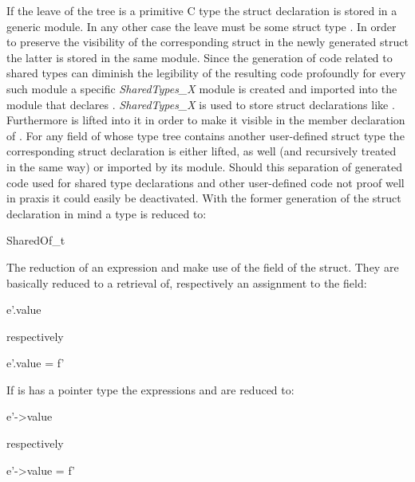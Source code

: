 \vspace{0.5cm}
If the leave of the tree is a primitive C type the struct declaration is stored in a generic module. In any other case the leave must be some struct type . In order to preserve the visibility of the corresponding struct in the newly generated struct  the latter is stored in the same module. Since the generation of code related to shared types can diminish the legibility of the resulting code profoundly for every such module a specific \textit{SharedTypes\_X} module is created and imported into the module that declares . \textit{SharedTypes\_X} is used to store struct declarations like . Furthermore  is lifted into it in order to make it visible in the member declaration  of . For any field of  whose type tree contains another user-defined struct type the corresponding struct declaration is either lifted, as well (and recursively treated in the same way) or imported by its module. Should this separation of generated code used for shared type declarations and other user-defined code not proof well in praxis it could easily be deactivated.
With the former generation of the struct declaration in mind a type  is reduced to:
\begin{ccode}
SharedOf_t
\end{ccode}
The reduction of an expression  and  make use of the  field of the  struct. They are basically reduced to a retrieval of, respectively an assignment to the field:

\begin{minipage}{0.15\textwidth}
\begin{ccode}
e'.value
\end{ccode}
\end{minipage}
\begin{minipage}{0.2\textwidth}
respectively
\end{minipage}
\begin{minipage}{0.3\textwidth}
\begin{ccode}
e'.value = f'
\end{ccode}
\end{minipage}

If  is has a pointer type the expressions  and  are reduced to:

\begin{minipage}{0.15\textwidth}
\begin{ccode}
e'->value
\end{ccode}
\end{minipage}
\begin{minipage}{0.2\textwidth}
respectively
\end{minipage}
\begin{minipage}{0.3\textwidth}
\begin{ccode}
e'->value = f'
\end{ccode}
\end{minipage}

